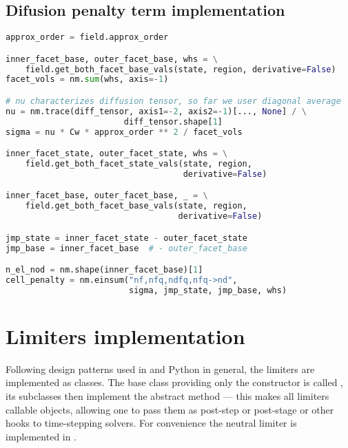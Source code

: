 \subsection{Difusion penalty term implementation}
\label{se:diff_penal_term_imp}
\setcounter{lstannotation}{0}
\begin{lstlisting}[language=Python, caption=Computation of penalty cell
fluxes]
approx_order = field.approx_order

inner_facet_base, outer_facet_base, whs = \
    field.get_both_facet_base_vals(state, region, derivative=False)
facet_vols = nm.sum(whs, axis=-1)

# nu characterizes diffusion tensor, so far we user diagonal average
nu = nm.trace(diff_tensor, axis1=-2, axis2=-1)[..., None] / \
                        diff_tensor.shape[1]
sigma = nu * Cw * approx_order ** 2 / facet_vols

inner_facet_state, outer_facet_state, whs = \
    field.get_both_facet_state_vals(state, region,
                                    derivative=False)

inner_facet_base, outer_facet_base, _ = \
    field.get_both_facet_base_vals(state, region,
                                   derivative=False)

jmp_state = inner_facet_state - outer_facet_state
jmp_base = inner_facet_base  # - outer_facet_base

n_el_nod = nm.shape(inner_facet_base)[1]
cell_penalty = nm.einsum("nf,nfq,ndfq,nfq->nd",
                         sigma, jmp_state, jmp_base, whs)

\end{lstlisting}

\section{Limiters implementation}
Following design patterns used in \sfepy{} and Python in general, the limiters are
implemented as classes. The base class providing only the constructor is called , its
subclasses then implement the abstract method  --- this makes all limiters callable
objects, allowing one to pass them as post-step or post-stage or other hooks to time-stepping
solvers. For convenience the neutral limiter is implemented in .


